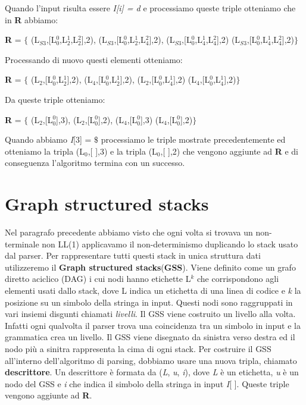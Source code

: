 \vspace{0.3cm}Quando l'input risulta essere \textit{I[i] = d} e processiamo queste triple otteniamo che in \textbf{R} abbiamo:\par 
\vspace{0.3cm}\textbf{R} = $\{$ (L$_{S3}$,[L$_0^{0}$,L$_2^{1}$,L$_2^{2}$],2), (L$_{S3}$,[L$_0^{0}$,L$_2^{1}$,L$_4^{2}$],2),  (L$_{S3}$,[L$_0^{0}$,L$_4^{1}$,L$_4^{2}$],2) (L$_{S3}$,[L$_0^{0}$,L$_4^{1}$,L$_4^{2}$],2)$\}$\par 
\vspace{0.3cm} Processando di nuovo questi elementi otteniamo:\par 
\vspace{0.3cm}\hspace{0.5cm}\textbf{R} = $\{$ (L$_{2}$,[L$_0^{0}$,L$_2^{1}$],2), (L$_{4}$,[L$_0^{0}$,L$_2^{1}$],2),  (L$_{2}$,[L$_0^{0}$,L$_4^{1}$],2) (L$_{4}$,[L$_0^{0}$,L$_4^{1}$],2)$\}$\par 
\vspace{0.3cm} Da queste triple otteniamo:\par 
\vspace{0.3cm}\hspace{0.5cm}\textbf{R} = $\{$ (L$_{2}$,[L$_0^{0}$],3), (L$_{2}$,[L$_0^{0}$],2),  (L$_{4}$,[L$_0^{0}$],3) (L$_{4}$,[L$_0^{0}$],2)$\}$\par 
\vspace{0.3cm} Quando abbiamo \textit{I}[3] = $\$$ processiamo le triple mostrate precedentemente ed otteniamo la tripla (L$_{0}$,[ ],3) e la tripla (L$_{0}$,[ ],2) che vengono aggiunte ad \textbf{R} e di conseguenza l'algoritmo termina con un successo.
\section{Graph structured stacks}
Nel paragrafo precedente abbiamo visto che ogni volta si trovava un non-terminale non LL(1) applicavamo il non-determinismo duplicando lo stack usato dal parser. Per rappresentare tutti questi stack in unica struttura dati utilizzeremo il \textbf{Graph structured stacks}(\textbf{GSS}). Viene definito \cite{tesi: lr} come un grafo diretto aciclico (DAG) i cui nodi hanno etichette L$^{k}$ che corrispondono agli elementi usati dallo stack, dove L indica un etichetta di una linea di codice e \textit{k} la posizione su un simbolo della stringa in input. Questi nodi sono raggruppati in vari insiemi disgunti chiamati \textit{livelli}. Il GSS viene costruito un livello alla volta. Infatti ogni qualvolta il parser trova una coincidenza tra un simbolo in input e la grammatica crea un livello. Il GSS viene disegnato da sinistra verso destra ed il nodo più a sinitra rappresenta la cima di ogni stack. Per costruire il GSS all'interno dell'algoritmo di parsing, dobbiamo usare una nuova tripla, chiamato \textbf{descrittore}. Un descrittore è formata da (\textit{L}, \textit{u}, \textit{i}), dove \textit{L} è un etichetta, \textit{u} è un nodo del GSS e \textit{i} che indica il simbolo della stringa in input \textit{I}[ ]. Queste triple vengono aggiunte ad \textbf{R}.
